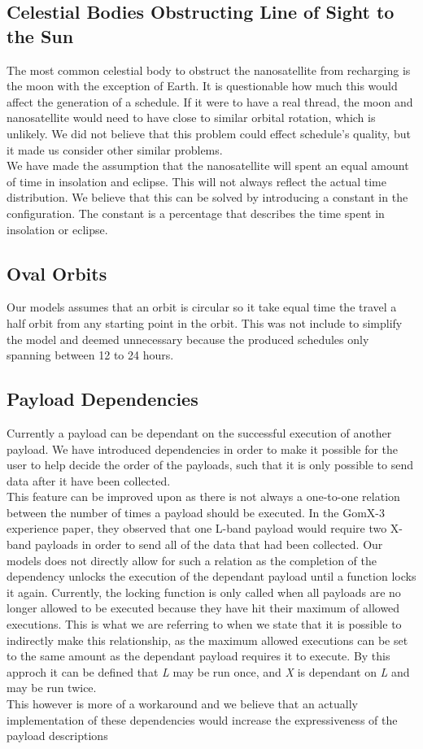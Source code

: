 \subsection*{Celestial Bodies Obstructing Line of Sight to the Sun}
The most common celestial body to obstruct the nanosatellite from recharging is the moon with the exception of Earth.
It is questionable how much this would affect the generation of a schedule. If it were to have a real thread, the moon and nanosatellite would need to have close to similar orbital rotation, which is unlikely. We did not believe that this problem could effect schedule's quality, but it made us consider other similar problems.\\
We have made the assumption that the nanosatellite will spent an equal amount of time in insolation and eclipse. This will not always reflect the actual time distribution. We believe that this can be solved by introducing a constant in the configuration. The constant is a percentage that describes the time spent in insolation or eclipse. 

\subsection*{Oval Orbits}
Our models assumes that an orbit is circular so it take equal time the travel a half orbit from any starting point in the orbit. This was not include to simplify the model and deemed unnecessary because the produced schedules only spanning between 12 to 24 hours. 

\subsection*{Payload Dependencies}
Currently a payload can be dependant on the successful execution of another payload. We have introduced dependencies in order to make it possible for the user to help decide the order of the payloads, such that it is only possible to send data after it have been collected.\\
This feature can be improved upon as there is not always a one-to-one relation between the number of times a payload should be executed. In the GomX-3 experience paper\cite{gomx3}, they observed that one L-band payload would require two X-band payloads in order to send all of the data that had been collected. 
Our models does not directly allow for such a relation as the completion of the dependency unlocks the execution of the dependant payload until a function locks it again. Currently, the locking function is only called when all payloads are no longer allowed to be executed because they have hit their maximum of allowed executions. 
This is what we are referring to when we state that it is possible to indirectly make this relationship, as the maximum allowed executions can be set to the same amount as the dependant payload requires it to execute. By this approch it can be defined that \textit{L} may be run once, and \textit{X} is dependant on \textit{L} and may be run twice.\\
This however is more of a workaround and we believe that an actually implementation of these dependencies would increase the expressiveness of the payload descriptions

